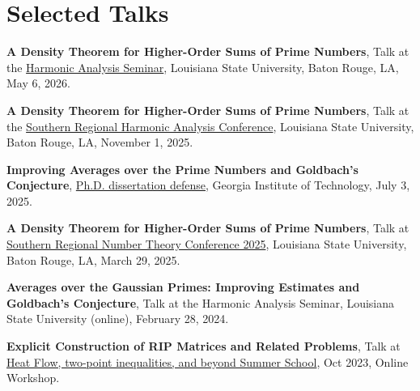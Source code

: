 \documentclass[11pt]{article}
\newenvironment{innerlist}[1][\enskip\textbullet]
        {\begin{compactitem}[#1]}{\end{compactitem}}
\begin{document}
\section{Selected Talks}



\begin{innerlist}[-]

\item {\bf A Density Theorem for Higher-Order Sums of Prime Numbers}, Talk at the \href{https://www.math.lsu.edu/calendar?selectevent=Harmonic+Analysis+Seminar&selecttime=all}{Harmonic Analysis Seminar}, Louisiana State University, Baton Rouge, LA, May 6, 2026.

\item {\bf A Density Theorem for Higher-Order Sums of Prime Numbers}, Talk at the \href{https://www.math.lsu.edu/~ha2025/}{Southern Regional Harmonic Analysis Conference}, Louisiana State University, Baton Rouge, LA, November 1, 2025.

\item {\bf Improving Averages over the Prime Numbers and Goldbach's Conjecture}, \href{https://math.gatech.edu/seminars-colloquia/series/dissertation-defense/yaghoub-rahimi-20250703}{Ph.D. dissertation defense}, Georgia Institute of Technology, July 3, 2025.

\item {\bf A Density Theorem for Higher-Order Sums of Prime Numbers}, Talk at \href{https://www.math.lsu.edu/~srntc/nt2025/schedule.html}{Southern Regional Number Theory Conference 2025}, Louisiana State University, Baton Rouge, LA, March 29, 2025.

\item {\bf Averages over the Gaussian Primes: Improving Estimates and Goldbach's Conjecture}, Talk at the Harmonic Analysis Seminar, Louisiana State University (online), February 28, 2024.



\item {\bf Explicit Construction of RIP Matrices and Related Problems}, Talk at \href{https://sites.google.com/view/paata/heat}{Heat Flow, two-point inequalities, and beyond Summer School}, Oct 2023, Online Workshop.


\end{innerlist}
\end{document}
